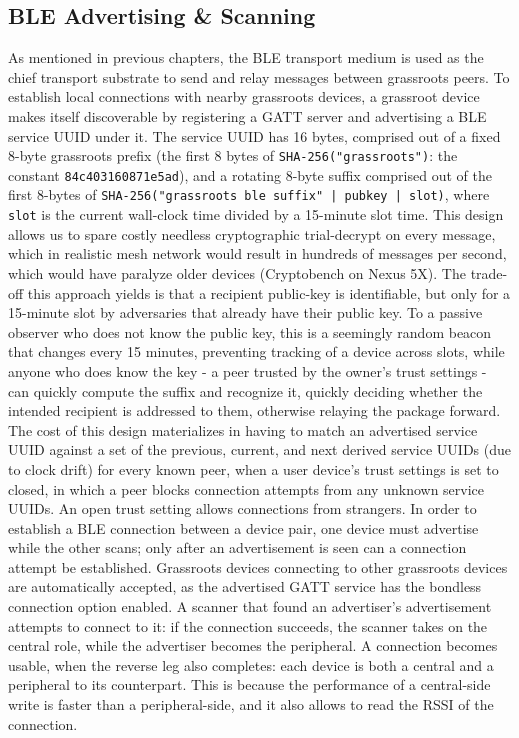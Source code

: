 \subsection{BLE Advertising \& Scanning}
\label{subsec:ble-adv-scan}
As mentioned in previous chapters, the BLE transport medium is used as the chief transport substrate to send and relay messages between grassroots peers.
To establish local connections with nearby grassroots devices, a grassroot device makes itself discoverable by registering a GATT server and advertising a BLE service UUID under it.
The service UUID has 16 bytes, comprised out of a fixed 8-byte grassroots prefix (the first 8 bytes of \verb|SHA-256("grassroots")|: the constant \verb|84c403160871e5ad|), and a rotating 8-byte suffix comprised out of the first 8-bytes of \verb!SHA-256("grassroots ble suffix" | pubkey | slot)!, where \verb|slot| is the current wall-clock time divided by a 15-minute slot time.
This design allows us to spare costly needless cryptographic trial-decrypt on every message, which in realistic mesh network would result in hundreds of messages per second, which would have paralyze older devices (Cryptobench on Nexus 5X). The trade-off this approach yields is that a recipient public-key is identifiable, but only for a 15-minute slot by adversaries that already have their public key. To a passive observer who does not know the public key, this is a seemingly random beacon that changes every 15 minutes, preventing tracking of a device across slots, while anyone who does know the key - a peer trusted by the owner's trust settings - can quickly compute the suffix and recognize it, quickly deciding whether the intended recipient is addressed to them, otherwise relaying the package forward.
The cost of this design materializes in having to match an advertised service UUID against a set of the previous, current, and next derived service UUIDs (due to clock drift) for every known peer, when a user device's trust settings is set to closed, in which a peer blocks connection attempts from any unknown service UUIDs. An open trust setting allows connections from strangers.
In order to establish a BLE connection between a device pair, one device must advertise while the other scans; only after an advertisement is seen can a connection attempt be established. Grassroots devices connecting to other grassroots devices are automatically accepted, as the advertised GATT service has the bondless connection option enabled.
A scanner that found an advertiser's advertisement attempts to connect to it: if the connection succeeds, the scanner takes on the central role, while the advertiser becomes the peripheral. A connection becomes usable, when the reverse leg also completes: each device is both a central and a peripheral to its counterpart. This is because the performance of a central-side write is faster than a peripheral-side, and it also allows to read the RSSI of the connection.

